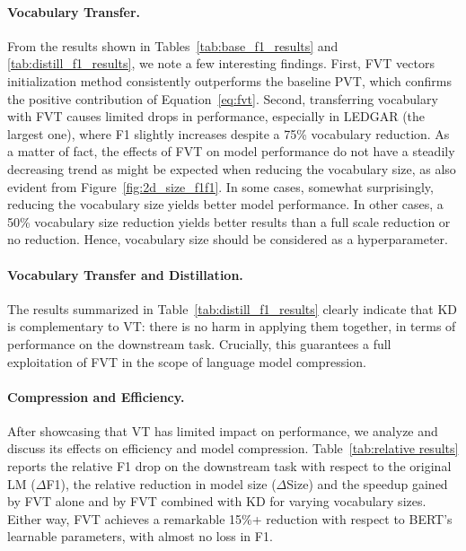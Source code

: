 \documentclass[11pt]{article}
\begin{document}
\paragraph{Vocabulary Transfer.}
From the results shown in Tables~\ref{tab:base_f1_results} and \ref{tab:distill_f1_results}, we note a few interesting findings. First, FVT vectors initialization method consistently outperforms the baseline PVT, which confirms the positive contribution of Equation~\ref{eq:fvt}. Second, transferring vocabulary with FVT causes limited drops in performance, especially in LEDGAR (the largest one), where F1 slightly increases despite a 75\% vocabulary reduction. As a matter of fact, the effects of FVT on model performance do not have a steadily decreasing trend as might be expected when reducing the vocabulary size, as also evident from Figure~\ref{fig:2d_size_f1f1}. In some cases, somewhat surprisingly, reducing the vocabulary size yields better model performance. 
In other cases, a 50\% vocabulary size reduction yields better results than a full scale reduction or no reduction. Hence, vocabulary size should be considered as a hyperparameter.

\paragraph{Vocabulary Transfer and Distillation.} %
The results summarized in Table~\ref{tab:distill_f1_results} clearly indicate that KD is complementary to VT: there is no harm in applying them together, in terms of performance on the downstream task. Crucially, this guarantees a full exploitation of FVT in the scope of language model compression.

\paragraph{Compression and Efficiency.} After showcasing that VT has limited impact on performance, we analyze and discuss its effects on efficiency and model compression. Table~\ref{tab:relative results} reports the relative F1 drop on the downstream task with respect to the original LM ($\Delta$F1), the relative reduction in model size ($\Delta$Size) and the speedup gained by FVT alone and by FVT combined with KD for varying vocabulary sizes. %
Either way, FVT achieves a remarkable 15\%+ reduction with respect to BERT's learnable parameters, with almost no loss in F1. 
\end{document}
